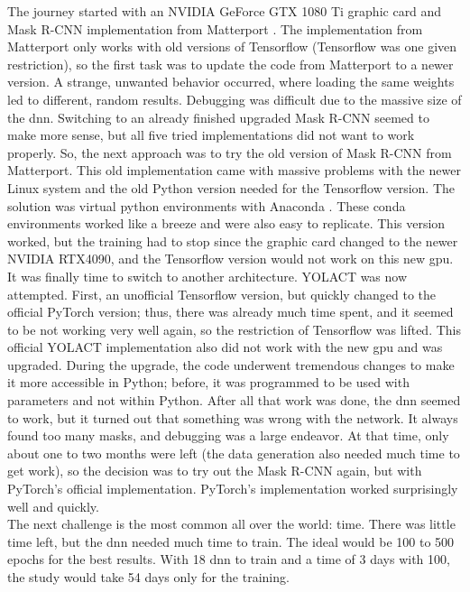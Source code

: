 		The journey started with an NVIDIA GeForce GTX 1080 Ti graphic card and Mask R-CNN implementation from Matterport \cite{Matterport}. The implementation from Matterport only works with old versions of Tensorflow (Tensorflow was one given restriction), so the first task was to update the code from Matterport to a newer version. A strange, unwanted behavior occurred, where loading the same weights led to different, random results. Debugging was difficult due to the massive size of the \acl{dnn}. Switching to an already finished upgraded Mask R-CNN seemed to make more sense, but all five tried implementations did not want to work properly. So, the next approach was to try the old version of Mask R-CNN from Matterport. This old implementation came with massive problems with the newer Linux system and the old Python version needed for the Tensorflow version. The solution was virtual python environments with Anaconda \cite{anaconda}. These conda environments worked like a breeze and were also easy to replicate. This version worked, but the training had to stop since the graphic card changed to the newer NVIDIA RTX4090, and the Tensorflow version would not work on this new \ac{gpu}. It was finally time to switch to another architecture. YOLACT \cite{Bolya2019} was now attempted. First, an unofficial Tensorflow version, but quickly changed to the official PyTorch version; thus, there was already much time spent, and it seemed to be not working very well again, so the restriction of Tensorflow was lifted. This official YOLACT implementation also did not work with the new \ac{gpu} and was upgraded. During the upgrade, the code underwent tremendous changes to make it more accessible in Python; before, it was programmed to be used with parameters and not within Python. After all that work was done, the \ac{dnn} seemed to work, but it turned out that something was wrong with the network. It always found too many masks, and debugging was a large endeavor. At that time, only about one to two months were left (the data generation also needed much time to get work), so the decision was to try out the Mask R-CNN again, but with PyTorch's official implementation. PyTorch's implementation worked surprisingly well and quickly. \\
		The next challenge is the most common all over the world: time. There was little time left, but the \ac{dnn} needed much time to train. The ideal would be 100 to 500 epochs for the best results. With 18 \ac{dnn} to train and a time of 3 days with 100, the study would take 54 days only for the training.\\
